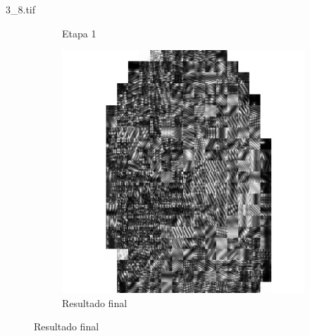 \documentclass{beamer}
\begin{document}
\begin{frame}{3\_8.tif}
\begin{figure}
\begin{subfigure}[!ht]{0.32\textwidth}
                \caption{Etapa 1}
            \end{subfigure}
            \begin{subfigure}[!ht]{0.32\textwidth}
                \includegraphics[width=\columnwidth]{Fingerprints/3_8_final.jpg}
                \caption{Resultado final}
            \end{subfigure}
        \end{figure}
    \end{frame}

\end{document}
